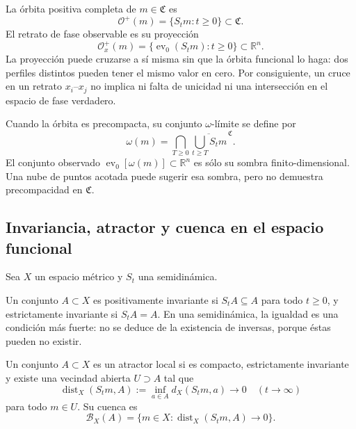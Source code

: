 La órbita positiva completa de \(m\in\mathfrak C\) es
\begin{equation}
 \mathcal O^+(m)=\{S_tm:t\geq0\}\subset\mathfrak C.
 \label{eq:geofo-functional-orbit}
\end{equation}
El retrato de fase observable es su proyección
\begin{equation}
 \mathcal O_x^+(m)=
 \{\operatorname{ev}_0(S_tm):t\geq0\}\subset\mathbb R^n.
 \label{eq:geofo-projected-orbit}
\end{equation}
La proyección puede cruzarse a sí misma sin que la órbita funcional lo haga:
dos perfiles distintos pueden tener el mismo valor en cero. Por consiguiente,
un cruce en un retrato \(x_i\)--\(x_j\) no implica ni falta de unicidad ni una
intersección en el espacio de fase verdadero.

Cuando la órbita es precompacta, su conjunto \(\omega\)-límite se define por
\begin{equation}
 \omega(m)=\bigcap_{T\geq0}
 \overline{\bigcup_{t\geq T}S_tm}^{\,\mathfrak C}.
 \label{eq:geofo-omega-limit}
\end{equation}
El conjunto observado
\(\operatorname{ev}_0[\omega(m)]\subset\mathbb R^n\) es sólo su sombra
finito-dimensional. Una nube de puntos acotada puede sugerir esa sombra, pero
no demuestra precompacidad en \(\mathfrak C\).

\subsection{Invariancia, atractor y cuenca en el espacio funcional}

Sea \(X\) un espacio métrico y \(S_t\) una semidinámica.

\begin{definition}[invariancia]
Un conjunto \(A\subset X\) es positivamente invariante si
\(S_tA\subseteq A\) para todo \(t\geq0\), y estrictamente invariante si
\(S_tA=A\). En una semidinámica, la igualdad es una condición más fuerte: no
se deduce de la existencia de inversas, porque éstas pueden no existir.
\end{definition}

\begin{definition}
Un conjunto \(A\subset X\) es un atractor local si es compacto, estrictamente
invariante y existe una vecindad abierta \(U\supset A\) tal que
\begin{equation}
 \operatorname{dist}_X(S_tm,A):=
 \inf_{a\in A}d_X(S_tm,a)\longrightarrow0
 \quad(t\to\infty)
 \label{eq:geofo-attraction}
\end{equation}
para todo \(m\in U\). Su cuenca es
\begin{equation}
 \mathcal B_X(A)=\{m\in X:
 \operatorname{dist}_X(S_tm,A)\to0\}.
 \label{eq:geofo-functional-basin}
\end{equation}
\end{definition}

